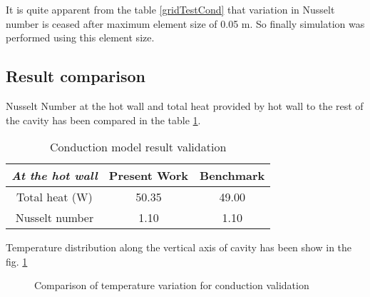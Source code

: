It is quite apparent from the table \ref{gridTestCond} that variation in Nusselt number is ceased after maximum element size of 0.05 m. So finally simulation was performed using this element size.

\subsection{Result comparison}
Nusselt Number at the hot wall and total heat provided by hot wall to the rest of the cavity has been compared in the table \ref{tab:conductionModelResultValidation}.

\begin{table}[H]
\centering
\caption{Conduction model result validation}
\label{tab:conductionModelResultValidation}
\begin{tabular}{@{}|c|c|c|@{}}
\toprule
\textit{\textbf{At the hot wall}} & \textbf{Present Work} & \textbf{Benchmark} \\ \midrule
Total heat (W)                    & 50.35                 & 49.00              \\ \midrule
Nusselt number                    & 1.10                  & 1.10               \\ \bottomrule
\end{tabular}
\end{table}

Temperature distribution along the vertical axis of cavity has been show in the fig. \ref{fig:validationConduction}


\begin{figure}[H]
\centering     %
{}
\caption{Comparison of temperature variation for conduction validation}
\label{fig:validationConduction}
\end{figure}

